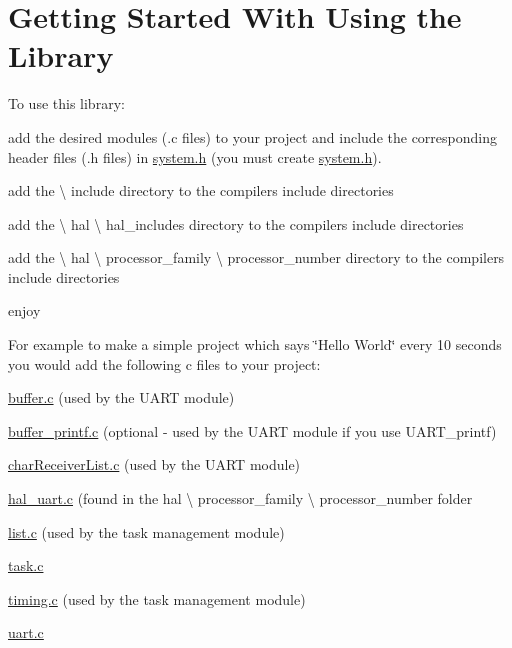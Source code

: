 \hypertarget{index_getting_started}{}\section{Getting Started With Using the Library}\label{index_getting_started}
To use this library\+:
\begin{DoxyItemize}
\item add the desired modules (.c files) to your project and include the corresponding header files (.h files) in \hyperlink{system_8h}{system.\+h} (you must create \hyperlink{system_8h}{system.\+h}).
\item add the \textbackslash{} include directory to the compilers include directories
\item add the \textbackslash{} hal \textbackslash{} hal\+\_\+includes directory to the compilers include directories
\item add the \textbackslash{} hal \textbackslash{} processor\+\_\+family \textbackslash{} processor\+\_\+number directory to the compilers include directories
\item enjoy
\end{DoxyItemize}

For example to make a simple project which says \char`\"{}\+Hello World\char`\"{} every 10 seconds you would add the following c files to your project\+:
\begin{DoxyItemize}
\item \hyperlink{buffer_8c}{buffer.\+c} (used by the U\+A\+R\+T module)
\item \hyperlink{buffer__printf_8c}{buffer\+\_\+printf.\+c} (optional -\/ used by the U\+A\+R\+T module if you use U\+A\+R\+T\+\_\+printf)
\item \hyperlink{char_receiver_list_8c}{char\+Receiver\+List.\+c} (used by the U\+A\+R\+T module)
\item \hyperlink{hal__uart_8c}{hal\+\_\+uart.\+c} (found in the hal \textbackslash{} processor\+\_\+family \textbackslash{} processor\+\_\+number folder
\item \hyperlink{list_8c}{list.\+c} (used by the task management module)
\item \hyperlink{task_8c}{task.\+c}
\item \hyperlink{timing_8c}{timing.\+c} (used by the task management module)
\item \hyperlink{uart_8c}{uart.\+c}
\end{DoxyItemize}

